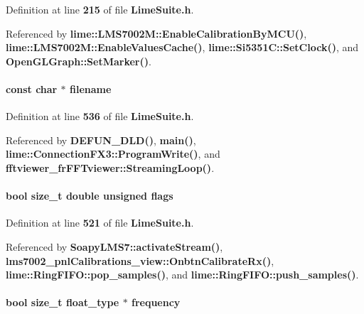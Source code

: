 Definition at line {\bf 215} of file {\bf Lime\+Suite.\+h}.



Referenced by {\bf lime\+::\+L\+M\+S7002\+M\+::\+Enable\+Calibration\+By\+M\+C\+U()}, {\bf lime\+::\+L\+M\+S7002\+M\+::\+Enable\+Values\+Cache()}, {\bf lime\+::\+Si5351\+C\+::\+Set\+Clock()}, and {\bf Open\+G\+L\+Graph\+::\+Set\+Marker()}.

\paragraph[{filename}]{\setlength{\rightskip}{0pt plus 5cm}const char $\ast$ filename}\label{group__FN__HIGH__LVL_ga28849770c8bfeb04039d7dd29d4dfa35}


Definition at line {\bf 536} of file {\bf Lime\+Suite.\+h}.



Referenced by {\bf D\+E\+F\+U\+N\+\_\+\+D\+L\+D()}, {\bf main()}, {\bf lime\+::\+Connection\+F\+X3\+::\+Program\+Write()}, and {\bf fftviewer\+\_\+fr\+F\+F\+Tviewer\+::\+Streaming\+Loop()}.

\paragraph[{flags}]{\setlength{\rightskip}{0pt plus 5cm}bool size\+\_\+t double unsigned flags}\label{group__FN__HIGH__LVL_ga73c01a58a13194faf47a78ed0917247d}


Definition at line {\bf 521} of file {\bf Lime\+Suite.\+h}.



Referenced by {\bf Soapy\+L\+M\+S7\+::activate\+Stream()}, {\bf lms7002\+\_\+pnl\+Calibrations\+\_\+view\+::\+Onbtn\+Calibrate\+Rx()}, {\bf lime\+::\+Ring\+F\+I\+F\+O\+::pop\+\_\+samples()}, and {\bf lime\+::\+Ring\+F\+I\+F\+O\+::push\+\_\+samples()}.

\paragraph[{frequency}]{\setlength{\rightskip}{0pt plus 5cm}bool size\+\_\+t {\bf float\+\_\+type} $\ast$ frequency}\label{group__FN__HIGH__LVL_ga0d6d2a17845b8d678835c742f5eb6ac4}


